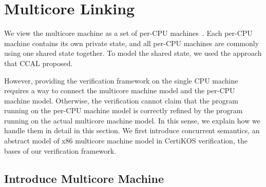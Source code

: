 \section{Multicore Linking}
\label{sec:multicore}

We view the multicore machine as a set of per-CPU machines~.
Each per-CPU machine contains its own private state, and all per-CPU machines are commonly using 
one shared state together. 
To model the shared state, we used the approach that CCAL proposed. 

However, providing the verification framework on the single CPU machine requires a way to connect the multicore machine model and the per-CPU machine model. 
Otherwise, the verification cannot claim that the program running on the per-CPU machine model is correctly refined by the 
program running on the actual multicore machine model.
In this sense, we explain how we handle them in detail in this section. 
We first introduce concurrent semantics, an abstract model of x86 multicore machine model in CertiKOS verification, the bases of our verification framework. 


\clearpage

\subsection{Introduce Multicore Machine}
\label{subsec:multicoremachine}


